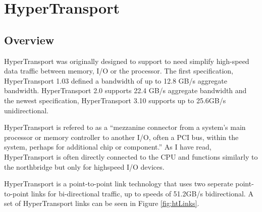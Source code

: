 \documentclass[conference]{IEEEtran}
\begin{document}
\section{HyperTransport}
\label{sec:ht}

\subsection{Overview}
\label{subsec:ht:over}
HyperTransport was originally designed to support to need simplify high-speed
data traffic between memory, I/O or the processor. The first
specification, HyperTransport 1.03 defined a bandwidth of up
to 12.8 GB/s aggregate bandwidth.\cite{htWhitePaper} HyperTransport 2.0
supports 22.4 GB/s aggregate bandwidth and the newest specification,
HyperTransport 3.10 supports up to 25.6GB/s unidirectional.

HyperTransport is refered to as a ``mezzanine connector from a system's main
processor or memory controller to another I/O, often a PCI bus, within the
system, perhaps for additional chip or component.''\cite{paulson2003ins} As I
have read, HyperTransport is often directly connected to the CPU and functions
similarly to the northbridge but only for highspeed I/O devices. 

HyperTransport is a point-to-point link technology that uses two seperate
point-to-point links for bi-directional traffic, up to speeds of 51.2GB/s
bidirectional. A set of HyperTransport links can be seen in Figure
\ref{fig:htLinks}. 
\end{document}
